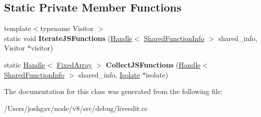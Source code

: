 \subsection*{Static Private Member Functions}
\begin{DoxyCompactItemize}
\item 
{\footnotesize template$<$typename Visitor $>$ }\\static void {\bfseries Iterate\+J\+S\+Functions} (\hyperlink{classv8_1_1internal_1_1_handle}{Handle}$<$ \hyperlink{classv8_1_1internal_1_1_shared_function_info}{Shared\+Function\+Info} $>$ shared\+\_\+info, Visitor $\ast$visitor)\hypertarget{classv8_1_1internal_1_1_literal_fixer_a5b41b883571a2e632d704d4d246dfbb5}{}\label{classv8_1_1internal_1_1_literal_fixer_a5b41b883571a2e632d704d4d246dfbb5}

\item 
static \hyperlink{classv8_1_1internal_1_1_handle}{Handle}$<$ \hyperlink{classv8_1_1internal_1_1_fixed_array}{Fixed\+Array} $>$ {\bfseries Collect\+J\+S\+Functions} (\hyperlink{classv8_1_1internal_1_1_handle}{Handle}$<$ \hyperlink{classv8_1_1internal_1_1_shared_function_info}{Shared\+Function\+Info} $>$ shared\+\_\+info, \hyperlink{classv8_1_1internal_1_1_isolate}{Isolate} $\ast$isolate)\hypertarget{classv8_1_1internal_1_1_literal_fixer_af6acb6f3104743e0f277f201337c8784}{}\label{classv8_1_1internal_1_1_literal_fixer_af6acb6f3104743e0f277f201337c8784}

\end{DoxyCompactItemize}


The documentation for this class was generated from the following file\+:\begin{DoxyCompactItemize}
\item 
/\+Users/joshgav/node/v8/src/debug/liveedit.\+cc\end{DoxyCompactItemize}
